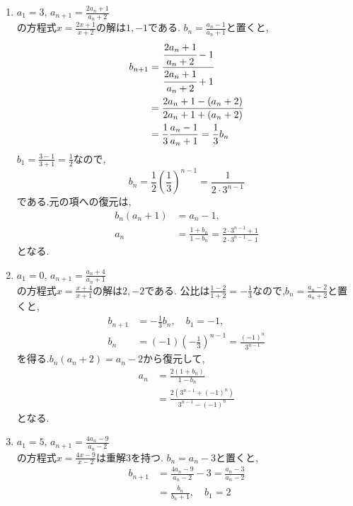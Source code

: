 \noindent{}\par\nobreak
\begin{enumerate}[label=(\arabic*),parsep=3pt,format=\bookitemlink{example-mobius-1}{solution}{problem}]
  \item $a_1=3,\, a_{n+1}=\frac{2a_n+1}{a_n+2}$\\
    の方程式$x=\frac{2x+1}{x+2}$の解は$1,-1$である.
    $b_n=\frac{a_n-1}{a_n+1}$と置くと,
    \begin{align*}
      b_{n+1}&=\cfrac{\cfrac{2a_n+1}{a_n+2}-1}{\cfrac{2a_n+1}{a_n+2}+1}\\
      &=\frac{2a_n+1-(a_n+2)}{2a_n+1+(a_n+2)}\\
      &=\frac13\frac{a_n-1}{a_n+1}=\frac13b_n
    \end{align*}
    $b_1=\frac{3-1}{3+1}=\frac{1}{2}$なので,
    \[
      b_n=\frac12\left(\frac13\right)^{n-1}
      =\frac1{2\cdot3^{n-1}}
    \]
    である.元の項への復元は,
    \begin{align*}
      b_n(a_n+1)&=a_n-1,\\
      a_n&=\frac{1+b_n}{1-b_n}
      =\frac{2\cdot3^{n-1}+1}{2\cdot3^{n-1}-1}
    \end{align*}
    となる.
  \item $a_1=0,\, a_{n+1}=\frac{a_n+4}{a_n+1}$\\
    の方程式$x=\frac{x+4}{x+1}$の解は$2,-2$である.
    公比は$\frac{1-2}{1+2}=-\frac{1}{3}$なので,$b_n=\frac{a_n-2}{a_n+2}$と置くと,
    \begin{align*}
      b_{n+1}&=-\frac13b_n,\quad b_1=-1,\\
      b_n&=(-1)\left(-\frac13\right)^{n-1}
      =\frac{(-1)^n}{3^{n-1}}
    \end{align*}
    を得る.$b_n(a_n+2)=a_n-2$から復元して,
    \begin{align*}
      a_n&=\frac{2(1+b_n)}{1-b_n}\\
      &=\frac{2\left(3^{n-1}+(-1)^n\right)}{3^{n-1}-(-1)^n}
    \end{align*}
    となる.
  \item $a_1=5,\, a_{n+1}=\frac{4a_n-9}{a_n-2}$\\
    の方程式$x=\frac{4x-9}{x-2}$は重解$3$を持つ.
    $b_n=a_n-3$と置くと,
    \begin{align*}
      b_{n+1}&=\frac{4a_n-9}{a_n-2}-3
      =\frac{a_n-3}{a_n-2}\\
      &=\frac{b_n}{b_n+1},\quad b_1=2

\end{align*}
\end{enumerate}
